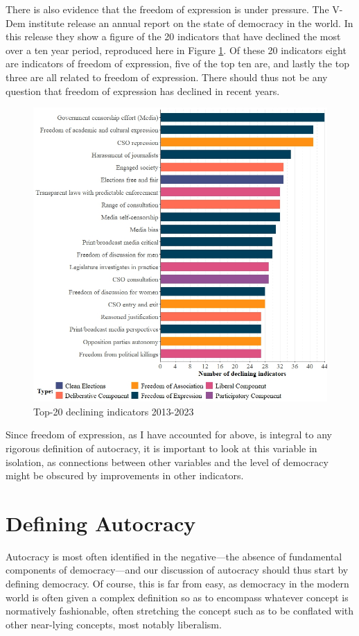 There is also evidence that the freedom of expression is under pressure. The V-Dem institute release an annual report on the state of democracy in the world. In this release they show a figure of the 20 indicators that have declined the most over a ten year period, reproduced here in Figure \ref{fig:declining}. Of these 20 indicators eight are indicators of freedom of expression, five of the top ten are, and lastly the top three are all related to freedom of expression. There should thus not be any question that freedom of expression has declined in recent years.

\begin{figure}[hbt!]
    \centering
    \includegraphics[width=.8\linewidth]{graphics/declining_indicators.jpeg}
    \caption{Top-20 declining indicators 2013-2023 \citep[p. 16]{nord_democracy_2024}}
    \label{fig:declining}
\end{figure}

Since freedom of expression, as I have accounted for above, is integral to any rigorous definition of autocracy, it is important to look at this variable in isolation, as connections between other variables and the level of democracy might be obscured by improvements in other indicators.

\section{Defining Autocracy}
Autocracy is most often identified in the negative---the absence of fundamental components of democracy---and our discussion of autocracy should thus start by defining democracy. Of course, this is far from easy, as democracy in the modern world is often given a complex definition so as to encompass whatever concept is normatively fashionable, often stretching the concept such as to be conflated with other near-lying concepts, most notably liberalism.

